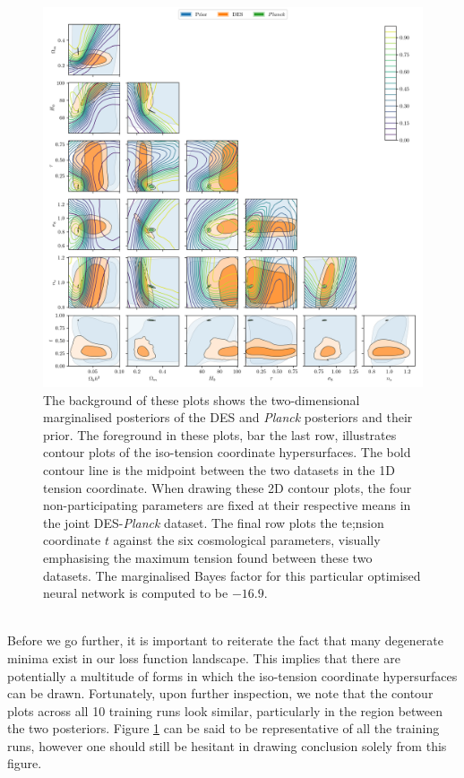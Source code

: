 \documentclass[%
 reprint,
 amsmath,amssymb,
 aps,
]{revtex4-2}
\begin{document}
\begin{figure}
    \includegraphics[width=\textwidth]{../plots/six.png}
    \centering
    \caption{The background of these plots shows the two-dimensional marginalised posteriors of the DES and \textit{Planck} posteriors and their prior. The foreground in these plots, bar the last row, illustrates contour plots of the iso-tension coordinate hypersurfaces. The bold contour line is the midpoint between the two datasets in the 1D tension coordinate. When drawing these 2D contour plots, the four non-participating parameters are fixed at their respective means in the joint DES-\textit{Planck} dataset. The final row plots the te;nsion coordinate $t$ against the six cosmological parameters, visually emphasising the maximum tension found between these two datasets. The marginalised Bayes factor for this particular optimised neural network is computed to be $-16.9$. \\ \\}
    \label{fig:six}
\end{figure}

Before we go further, it is important to reiterate the fact that many degenerate minima exist in our loss function landscape. This implies that there are potentially a multitude of forms in which the iso-tension coordinate hypersurfaces can be drawn. Fortunately, upon further inspection, we note that the contour plots across all 10 training runs look similar, particularly in the region between the two posteriors. Figure \ref{fig:six} can be said to be representative of all the training runs, however one should still be hesitant in drawing conclusion solely from this figure.
\end{document}
